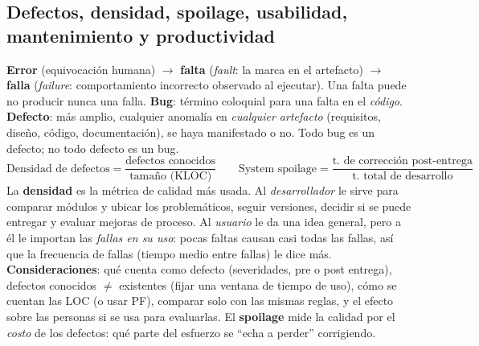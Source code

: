 \documentclass[11pt,a4paper]{article}
\begin{document}
\subsection{Defectos, densidad, spoilage, usabilidad, mantenimiento y productividad}
\textbf{Error} (equivocación humana) $\to$ \textbf{falta} (\emph{fault}: la marca en el artefacto) $\to$
\textbf{falla} (\emph{failure}: comportamiento incorrecto observado al ejecutar). Una falta puede no producir
nunca una falla. \textbf{Bug}: término coloquial para una falta en el \emph{código}. \textbf{Defecto}: más
amplio, cualquier anomalía en \emph{cualquier artefacto} (requisitos, diseño, código, documentación), se haya
manifestado o no. Todo bug es un defecto; no todo defecto es un bug.
\[ \text{Densidad de defectos} = \frac{\text{defectos conocidos}}{\text{tamaño (KLOC)}} \qquad
\text{System spoilage} = \frac{\text{t.\ de corrección post-entrega}}{\text{t.\ total de desarrollo}} \]
La \textbf{densidad} es la métrica de calidad más usada. Al \emph{desarrollador} le sirve para comparar módulos
y ubicar los problemáticos, seguir versiones, decidir si se puede entregar y evaluar mejoras de proceso. Al
\emph{usuario} le da una idea general, pero a él le importan las \emph{fallas en su uso}: pocas faltas causan
casi todas las fallas, así que la frecuencia de fallas (tiempo medio entre fallas) le dice más.
\textbf{Consideraciones}: qué cuenta como defecto (severidades, pre o post entrega), defectos conocidos $\ne$
existentes (fijar una ventana de tiempo de uso), cómo se cuentan las LOC (o usar PF), comparar solo con las
mismas reglas, y el efecto sobre las personas si se usa para evaluarlas. El \textbf{spoilage} mide la calidad
por el \emph{costo} de los defectos: qué parte del esfuerzo se ``echa a perder'' corrigiendo.
\end{document}
